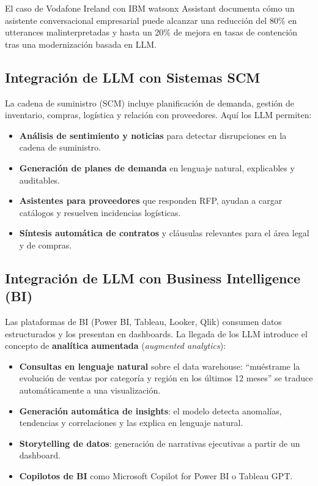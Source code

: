 \documentclass[12pt,a4paper,oneside]{article}
\begin{document}
El caso de Vodafone Ireland con IBM watsonx Assistant \cite{ibmVodafone} documenta cómo un asistente conversacional empresarial puede alcanzar una reducción del 80\% en utterances malinterpretadas y hasta un 20\% de mejora en tasas de contención tras una modernización basada en LLM.

\subsection{Integración de LLM con Sistemas SCM}

La cadena de suministro (SCM) incluye planificación de demanda, gestión de inventario, compras, logística y relación con proveedores. Aquí los LLM permiten:

\begin{itemize}[leftmargin=*]
    \item \textbf{Análisis de sentimiento y noticias} para detectar disrupciones en la cadena de suministro.
    \item \textbf{Generación de planes de demanda} en lenguaje natural, explicables y auditables.
    \item \textbf{Asistentes para proveedores} que responden RFP, ayudan a cargar catálogos y resuelven incidencias logísticas.
    \item \textbf{Síntesis automática de contratos} y cláusulas relevantes para el área legal y de compras.
\end{itemize}

\subsection{Integración de LLM con Business Intelligence (BI)}

Las plataformas de BI (Power BI, Tableau, Looker, Qlik) consumen datos estructurados y los presentan en dashboards. La llegada de los LLM introduce el concepto de \textbf{analítica aumentada} (\textit{augmented analytics}):

\begin{itemize}[leftmargin=*]
    \item \textbf{Consultas en lenguaje natural} sobre el data warehouse: ``muéstrame la evolución de ventas por categoría y región en los últimos 12 meses'' se traduce automáticamente a una visualización.
    \item \textbf{Generación automática de insights}: el modelo detecta anomalías, tendencias y correlaciones y las explica en lenguaje natural.
    \item \textbf{Storytelling de datos}: generación de narrativas ejecutivas a partir de un dashboard.
    \item \textbf{Copilotos de BI} como Microsoft Copilot for Power BI o Tableau GPT.
\end{itemize}
\end{document}
